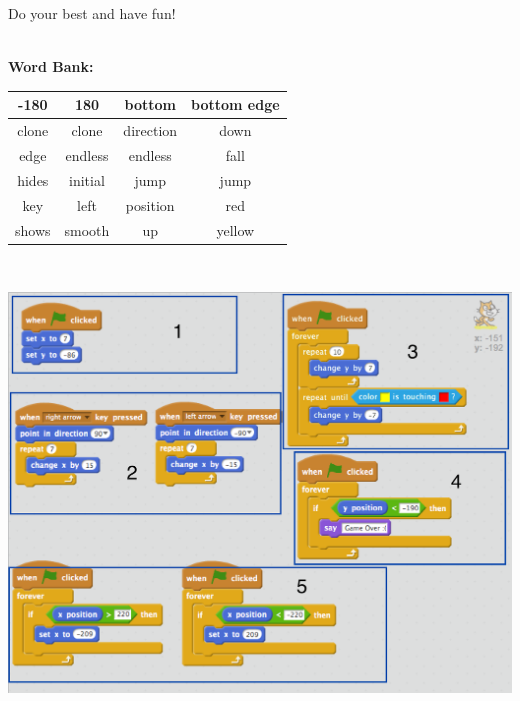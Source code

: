 \documentclass[11pt]{article}
\begin{document}
Do your best and have fun!\\
\noindent\makebox[\linewidth]{\rule{\paperwidth}{0.4pt}}\\
\begin{center}
\textbf{Word Bank:}
\begin{tabular}{|c|c|c|c|}
    \hline
    -180 & 180 & bottom & bottom edge \\
    \hline
    clone & clone & direction & down \\
    \hline
    edge & endless & endless & fall \\
    \hline
    hides & initial & jump & jump \\
    \hline
    key & left & position & red \\
    \hline
    shows & smooth & up & yellow \\
    \hline
\end{tabular}
\end{center}
\noindent\makebox[\linewidth]{\rule{\paperwidth}{0.4pt}}\\
\begin{center}
  \includegraphics[width=5.5in]{cat.png}
 \end{center}
\end{document}

